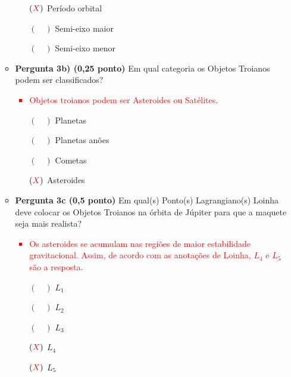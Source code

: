 \documentclass[a4paper, 12pt]{article}
\newcommand{\red}[1]
{
	\textcolor{red}{#1}
}
\begin{document}
\begin{flushleft}
\begin{itemize}
\begin{itemize}
\begin{itemize}
						\item[$(\red{X})$] Período orbital
						\item[$(\quad)$] Semi-eixo maior
						\item[$(\quad)$] Semi-eixo menor
					\end{itemize}
				\item \textbf{Pergunta 3b) (0,25 ponto)} Em qual categoria os Objetos Troianos podem ser classificados?
					\red{\begin{itemize}
						\item Objetos troianos podem ser Asteroides ou Satélites.
					\end{itemize}}
					\begin{itemize}
						\item[$(\quad)$] Planetas
						\item[$(\quad)$] Planetas anões
						\item[$(\quad)$] Cometas
						\item[$(\red{X})$] Asteroides
					\end{itemize}
				\item \textbf{Pergunta 3c (0,5 ponto)} Em qual(s) Ponto(s) Lagrangiano(s) Loinha deve colocar os Objetos Troianos na órbita de Júpiter para que a maquete seja mais realista?
					\red{\begin{itemize}
						\item Os asteroides se acumulam nas regiões de maior estabilidade gravitacional. Assim, de acordo com as anotações de Loinha, $L_4$ e $L_5$ são a resposta.
					\end{itemize}}
					\begin{itemize}
						\item[$(\quad)$] $L_1$
						\item[$(\quad)$] $L_2$
						\item[$(\quad)$] $L_3$
						\item[$(\red{X})$] $L_4$
						\item[$(\red{X})$] $L_5$
					\end{itemize}
			\end{itemize}
			

\end{itemize}
\end{flushleft}
\end{document}
